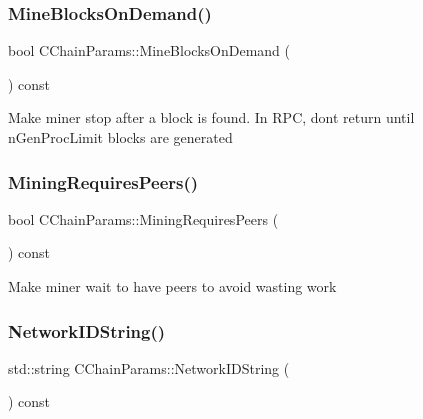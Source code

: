 \mbox{\label{class_c_chain_params_a96be31ff3d8525c9d5458b7d07ada6bb}} 
\subsubsection{\texorpdfstring{Mine\+Blocks\+On\+Demand()}{MineBlocksOnDemand()}}
{\footnotesize\ttfamily bool C\+Chain\+Params\+::\+Mine\+Blocks\+On\+Demand (\begin{DoxyParamCaption}{ }\end{DoxyParamCaption}) const\hspace{0.3cm}{\ttfamily [inline]}}

Make miner stop after a block is found. In R\+PC, don\textquotesingle{}t return until n\+Gen\+Proc\+Limit blocks are generated \mbox{\label{class_c_chain_params_a066ad4166984a31bdc0836193a6341ee}} 
\subsubsection{\texorpdfstring{Mining\+Requires\+Peers()}{MiningRequiresPeers()}}
{\footnotesize\ttfamily bool C\+Chain\+Params\+::\+Mining\+Requires\+Peers (\begin{DoxyParamCaption}{ }\end{DoxyParamCaption}) const\hspace{0.3cm}{\ttfamily [inline]}}

Make miner wait to have peers to avoid wasting work \mbox{\label{class_c_chain_params_a2c02cc73f7fe9369cee9a39a0fd5b710}} 
\subsubsection{\texorpdfstring{Network\+I\+D\+String()}{NetworkIDString()}}
{\footnotesize\ttfamily std\+::string C\+Chain\+Params\+::\+Network\+I\+D\+String (\begin{DoxyParamCaption}{ }\end{DoxyParamCaption}) const\hspace{0.3cm}{\ttfamily [inline]}}

